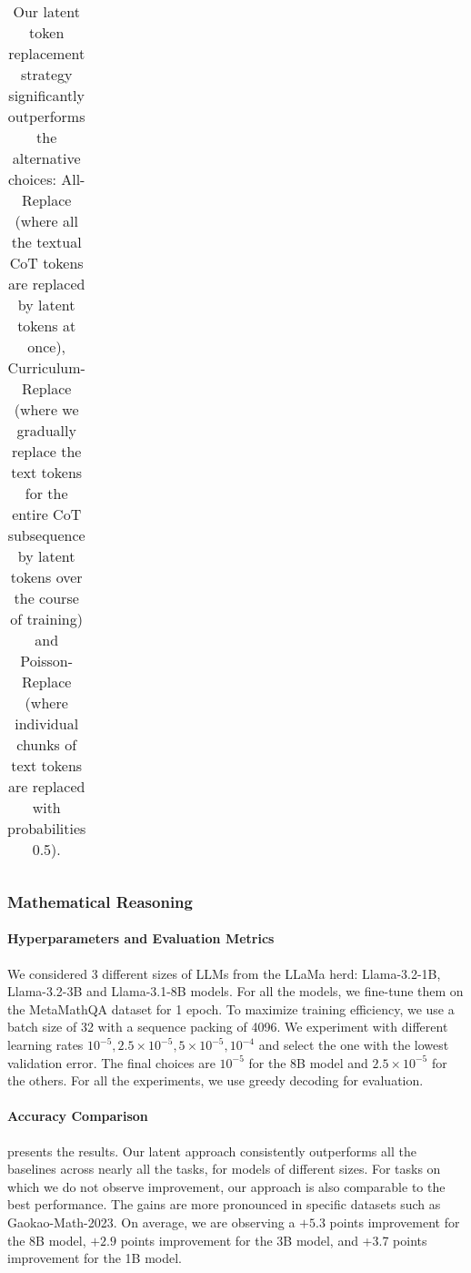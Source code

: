 \begin{table*}[t]
\begin{adjustbox}{width=\textwidth}
\begin{tabular}{lllllllllll}
\bottomrule
\end{tabular}
\end{adjustbox}
\caption{Our latent token replacement strategy significantly outperforms the alternative choices: All-Replace (where all the textual CoT tokens are replaced by latent tokens at once), Curriculum-Replace (where we gradually replace the text tokens for the entire CoT subsequence by latent tokens over the course of training) and Poisson-Replace (where individual chunks of text tokens are replaced with probabilities 0.5).}
\label{table:ablation_replacement}
\end{table*}




\subsubsection{Mathematical Reasoning}

\paragraph{Hyperparameters and Evaluation Metrics}
We considered 3 different sizes of LLMs from the LLaMa herd:  Llama-3.2-1B, Llama-3.2-3B and Llama-3.1-8B models. For all the models, we fine-tune them on the MetaMathQA dataset for 1 epoch. To maximize training efficiency, we use a batch size of 32 with a sequence packing of 4096.
We experiment with different learning rates $10^{-5}, 2.5 \times 10^{-5}, 5 \times 10^{-5}, 10^{-4}$ and select the one with the lowest validation error. 
The final choices are $10^{-5}$ for the 8B model and $2.5 \times 10^{-5}$ for the others. For all the experiments, we use greedy decoding for evaluation.

\paragraph{Accuracy Comparison}  presents the results. Our latent approach consistently outperforms all the baselines across nearly all the tasks, for models of different sizes. For tasks on which we do not observe improvement, our approach is also comparable to the best performance. The gains are more pronounced in specific datasets such as Gaokao-Math-2023. On average, we are observing a $+5.3$ points improvement for the 8B model, $+2.9$ points improvement for the 3B model, and +3.7 points improvement for the 1B model. 


